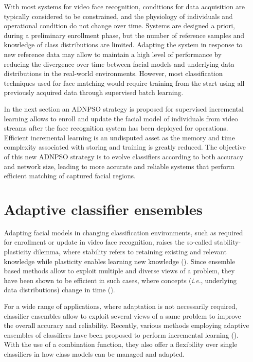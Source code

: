 With most systems for video face recognition, conditions for data acquisition are typically considered to be constrained, and the physiology of individuals and operational condition do not change over time. Systems are designed a priori, during a preliminary enrollment phase, but the number of reference samples and knowledge of class distributions are limited. 
Adapting the system in response to new reference data may allow to maintain a high level of performance by reducing the divergence over time between facial models and underlying data distributions in the real-world environments. However, most classification techniques used for face matching would require training from the start using all previously acquired data through supervised batch learning. 

In the next section an ADNPSO strategy is proposed  for supervised incremental learning allows to enroll and update the facial model of individuals from video streams after the face recognition system has been deployed for operations. Efficient incremental learning is an undisputed asset as the memory and time complexity associated with storing and training is greatly reduced. 
The objective of this new ADNPSO strategy is to evolve classifiers according to both accuracy and network size, leading to more accurate and reliable systems that perform efficient matching of captured facial regions.

\section{Adaptive classifier ensembles}
\label{sec:c3_adaptation}

Adapting facial models in changing classification environments, such as required for enrollment or update in video face recognition, raises the so-called stability-plasticity dilemma, where stability refers to retaining existing and relevant knowledge while plasticity enables learning new knowledge (\cite{grossberg88}).
Since ensemble based methods allow to exploit multiple and diverse views of a problem, they have been shown to be efficient in such cases, where concepts (\emph{i.e.}, underlying data distributions) change in time (\cite{minku10}).

For a wide range of applications, where adaptation is not necessarily required, classifier ensembles allow to exploit several views of a same problem to improve the overall accuracy and reliability.
Recently, various methods employing adaptive ensembles of classifiers have been proposed to perform incremental learning (\cite{kapp10, polikar01}).
With the use of a combination function, they also offer a flexibility over single classifiers in how class models can be managed and adapted.

